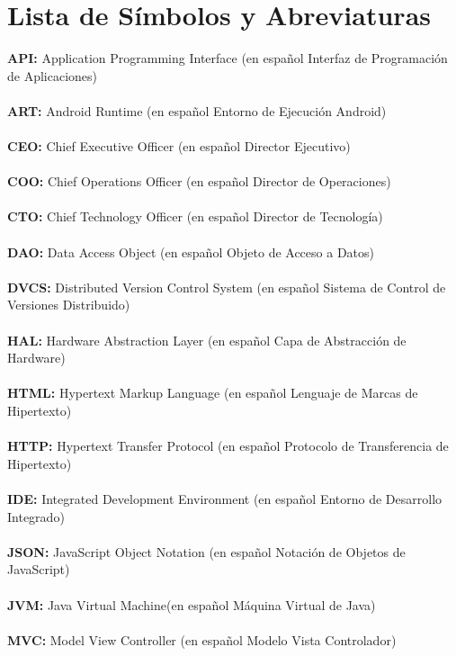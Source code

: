 \chapter*{Lista de Símbolos y Abreviaturas}%

\vspace{5 mm}
\noindent
\textbf{API:} Application Programming Interface (en español Interfaz de Programación de Aplicaciones)\\ \\
\textbf{ART:} Android Runtime (en español Entorno de Ejecución Android)\\ \\
\textbf{CEO:} Chief Executive Officer (en español Director Ejecutivo)\\ \\
\textbf{COO:} Chief Operations Officer (en español Director de Operaciones)\\ \\
\textbf{CTO:} Chief Technology Officer (en español Director de Tecnología)\\ \\
\textbf{DAO:} Data Access Object (en español Objeto de Acceso a Datos)\\ \\
\textbf{DVCS:} Distributed Version Control System (en español Sistema de Control de Versiones Distribuido)\\ \\
\textbf{HAL:} Hardware Abstraction Layer (en español Capa de Abstracción de Hardware)\\ \\
\textbf{HTML:} Hypertext Markup Language (en español Lenguaje de Marcas de Hipertexto)\\ \\
\textbf{HTTP:} Hypertext Transfer Protocol (en español Protocolo de Transferencia de Hipertexto)\\ \\
\textbf{IDE:} Integrated Development Environment (en español Entorno de Desarrollo Integrado)\\ \\
\textbf{JSON:} JavaScript Object Notation (en español Notación de Objetos de JavaScript)\\ \\
\textbf{JVM:} Java Virtual Machine(en español Máquina Virtual de Java)\\ \\
\textbf{MVC:} Model View Controller (en español Modelo Vista Controlador)\\ \\
